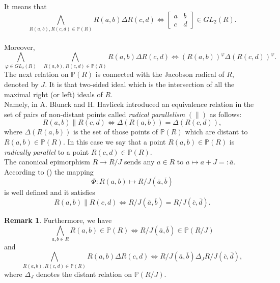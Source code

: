 \documentclass[12pt,a4paper]{article}
\theoremstyle{definition}
\newtheorem{rem}{Remark}
\begin{document}
It means that $$\bigwedge_{ R(a, b), R(c, d)\in \mathbb{P}(R)} R(a, b)\Delta R(c, d)\Leftrightarrow \left[\begin{array}{cclr}a & b \\ c & d \end{array}\right]\in GL_{2}(R).$$
\\
Moreover, $$\bigwedge_{ \varphi \in GL_{2}(R)}\ \ \ \bigwedge_{ R(a, b), R(c, d)\in \mathbb{P}(R)} R(a, b)\Delta R(c, d)\Leftrightarrow  (R(a, b))^{\varphi} \Delta (R(c, d))^{\varphi}.$$
The next relation on $\mathbb{P}(R)$ is connected with the Jacobson radical of $R$, denoted by $J$. It is that two-sided ideal which is the intersection of all the maximal right (or left) ideals of $R$.\\
Namely, in \cite{radical} A. Blunck and H. Havlicek introduced an equivalence relation in the set of pairs of non-distant points called {\sl radical parallelism} $(\parallel)$ as follows: $$R(a, b)\parallel R(c, d)\Leftrightarrow \Delta(R(a, b))=\Delta(R(c, d)),$$ where $\Delta(R(a, b))$ is the set of those points of $\mathbb{P}(R)$ which are distant to $R(a, b) \in \mathbb{P}(R)$. In this case we say that a point $R(a, b)\in \mathbb{P}(R)$ is {\sl radically parallel} to a point $R(c, d)\in \mathbb{P}(R)$.\\
The canonical epimorphism $R\to R/J$ sends any $a\in R$ to $a\mapsto
a+J=:\overline a$. According to (\cite[Theorem 2.2]{radical}) the mapping
\begin{equation*}
    \Phi: R(a, b) \mapsto R/J(\overline a, \overline b)
\end{equation*}
is well defined and it satisfies
\begin{equation*}
    R(a,b)\parallel R(c,d) \Leftrightarrow R/J(\overline{a}, \overline{b})=R/J(\overline{c}, \overline{d}).
\end{equation*}

\begin{rem}\cite{radical}\label{ilorazowy}
Furthermore, we have
$$\bigwedge_{a, b\in R}R(a, b)\in \mathbb{P}(R)\Leftrightarrow R/J(\overline{a}, \overline{b})\in \mathbb{P}(R/J)$$
and $$\bigwedge_{R(a, b), R(c, d)\in \mathbb{P}(R)}R(a, b)\Delta R(c, d)\Leftrightarrow R/J(\overline{a}, \overline{b})\Delta_J R/J(\overline{c}, \overline{d}),$$
where $\Delta_J$ denotes the distant relation on $\mathbb{P}(R/J)$.
\end{rem}
\end{document}
